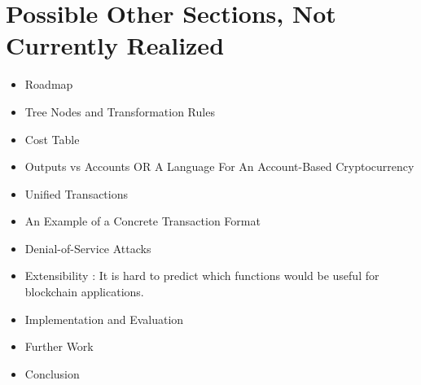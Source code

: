 \documentclass[11pt]{article}
\newcommand{\authnote}[2]{\marginpar{\parbox{\marginparwidth}{\tiny %
  \textsf{#1 {\textcolor{blue}{notes: #2}}}}}%
  \textcolor{blue}{\textbf{\dag}}}
\newcommand{\authnote}[2]{
  \textsf{#1 \textcolor{blue}{: #2}}}
\newcommand{\authnote}[2]{}
\newcommand{\knote}[1]{{\authnote{\textcolor{green}{kushti notes}}{#1}}}
\begin{document}
\section{Possible Other Sections, Not Currently Realized}
\begin{itemize}

\item Roadmap

\item Tree Nodes and Transformation Rules

\item Cost Table

\item Outputs vs Accounts OR A Language For An Account-Based Cryptocurrency

\item Unified Transactions

\item An Example of a Concrete Transaction Format \knote{Describe Ergo transaction format here. Malleability problems to be discussed here.}


\item Denial-of-Service Attacks

\item Extensibility : It is hard to predict which functions would be useful for blockchain applications.

\item Implementation and Evaluation

\item Further Work

\item Conclusion
\end{itemize}
\end{document}

